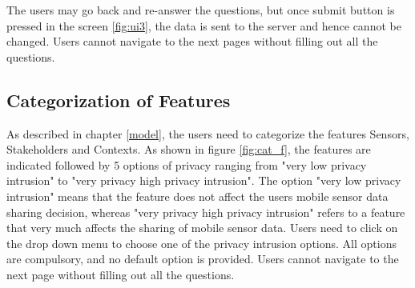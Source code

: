 The users may go back and re-answer the questions, but once submit button is pressed in the screen \ref{fig:ui3}, the data is sent to the server
and hence cannot be changed. Users cannot navigate to the next pages without filling out all the questions.

\subsection{Categorization of Features} \label{cat_feature}

As described in chapter \ref{model}, the users need to categorize the features Sensors, Stakeholders and Contexts. As shown in figure 
\ref{fig:cat_f}, the features are indicated followed by 5 options of privacy ranging from "very low privacy intrusion" to "very privacy high privacy intrusion". The option "very low privacy intrusion" means that the feature does not affect the users mobile sensor data sharing decision, whereas 
"very privacy high privacy intrusion" refers to a feature that very much affects the sharing of mobile sensor data. Users need to click on the
drop down menu to choose one of the privacy intrusion options. All options are compulsory, and no default option is provided. Users cannot navigate 
to the next page without filling out all the questions.

